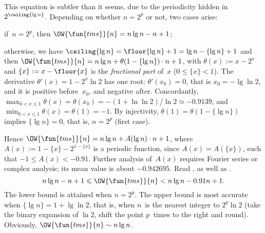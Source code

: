 This equation is subtler than it seems, due to the periodicity hidden
in \(2^{\ceiling{\lg n}}\). Depending on whether \(n = 2^p\) or not,
two cases arise:
\begin{itemize*}

  \item if~\(n=2^p\), then \(\OW{\fun{tms}}{n} = n\lg n - n +
    1\);

  \item otherwise, we have \(\ceiling{\lg n} = \floor{\lg n} + 1 = \lg
    n - \{\lg n\} + 1\) and then \(\OW{\fun{tms}}{n} = n\lg n +
    \theta(1 - \{\lg n\}) \cdot n + 1\), with \(\theta(x) := x - 2^x\)
    and \(\{x\} := x - \floor{x}\) is the \emph{fractional
    part} of~\(x\) (\(0 \leqslant \{x\} <
    1\)). The derivative \(\theta'(x) = 1 - 2^x\ln 2\) has one root:
    \(\theta'(x_0) = 0\), that is \(x_0 = -\lg\ln 2\), and it is
    positive before~\(x_0\), and negative after. Concordantly,
    \(\max_{0<x\leqslant 1}\theta(x) = \theta(x_0) =
    -(1+\ln\ln{2})/\!\ln{2} \simeq -0.9139\), and \(\min_{0<x\leqslant
      1}\theta(x) = \theta(1) = -1\). By injectivity, \(\theta(1) =
    \theta(1-\{\lg n\})\) implies \(\{\lg n\} = 0\), that is,
    \(n=2^p\) (first case).
\end{itemize*}
Hence \(\OW{\fun{tms}}{n} = n\lg n + A(\lg n) \cdot n + 1\), where
\(A(x) := 1 - \{x\} - 2^{1 - \{x\}}\) is a periodic function, since
\(A(x) = A(\{x\})\), such that \(-1 \leqslant A(x) < -0.91\). Further
analysis of~\(A(x)\) requires Fourier series or complex analysis; its
mean value is about \(-0.942695\). Read \cite{FlajoletGolin_1994}, as
well as \cite{PannyProdinger_1995}.
\begin{equation}
n\lg n - n + 1 \leqslant \OW{\fun{tms}}{n} <
n\lg n - 0.91 n + 1.\label{ineq:OWtms}
\end{equation}
The lower bound is attained when \(n=2^p\). The upper bound is most
accurate when \(\{\lg n\} = 1 + \lg\ln 2\), that is, when \(n\)~is the
nearest integer to \(2^p\ln 2\) (take the binary expansion of \(\ln
2\), shift the point \(p\)~times to the right and round). Obviously,
\(\OW{\fun{tms}}{n} \sim n\lg n\).


